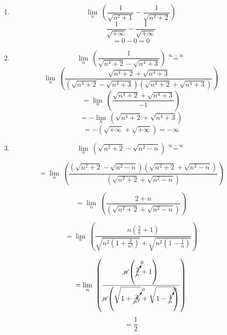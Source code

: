 \documentclass[20pt, a4paper]{extarticle}
\begin{document}
\begin{questoes}
\begin{enumerate}[label=\alph*)]
	\item \[\lim\limits_{n}\ \left(\frac{1}{\sqrt{n^2+1}}-\frac{1}{\sqrt{n^2+2}}\right)\]
	\[\frac{1}{\sqrt{+\infty}} - \frac{1}{\sqrt{+\infty}}\]
	\[= 0 - 0 = 0\]
	
	\item \[\lim\limits_{n}\ \left(\frac{1}{\sqrt{n^4+2}-\sqrt{n^4+3}}\right) \overset{\mathrm{\infty-\infty}}{=}\]\[\lim\limits_{n}\  \left(\frac{\sqrt{n^4+2}+\sqrt{n^4+3}}{\left(\sqrt{n^4+2}-\sqrt{n^4+3}\right)\left(\sqrt{n^4+2}+\sqrt{n^4+3}\right)}\right)\] 
	\[=\lim\limits_{n}\ \left(\frac{\sqrt{n^4+2}+\sqrt{n^4+3}}{-1}\right)\] 
	\[=-\lim\limits_{n}\ \left(\sqrt{n^4+2}+\sqrt{n^4+3}\right)\]
	\[=-\left(\sqrt{+\infty}+\sqrt{+\infty}\right) = - \infty\]
	\item \[\lim\limits_{n}\ \left(\sqrt{n^2+2}-\sqrt{n^2-n}\right)\overset{\mathrm{\infty-\infty}}{=}\]
	
	\[=\lim\limits_{n}\ \left(\frac{\left(\sqrt{n^2+2}-\sqrt{n^2-n}\right)\left(\sqrt{n^2+2}+\sqrt{n^2-n}\right)}{\left(\sqrt{n^2+2}+\sqrt{n^2-n}\right)}\right)\]
	
	\[=\lim\limits_{n}\ \left(\frac{2+n}{\left(\sqrt{n^2+2}+\sqrt{n^2-n}\right)}\right)\]
	
	\[=\lim\limits_{n}\ \left(\frac{n\left(\frac{2}{n}+1\right)}{\sqrt{n^2\left(1+\frac{2} {n^2}\right)}+{\sqrt{n^2\left(1-\frac{1} {n}\right)}}}\right)\]
	
	\[=\lim\limits_{n}\ \left(\frac{\cancel{n}\left(\cancelto{0}{\frac{2}{n}}+1\right)}{\cancel{n}\left(\sqrt{1+\cancelto{0}{\frac{2}{n^2}}}+{\sqrt{1-\cancelto{0}{\frac{1} {n}}}}\right)}\right)\]
	\[=\frac{1}{2}\]
\end{enumerate}
\end{questoes}
\end{document}
